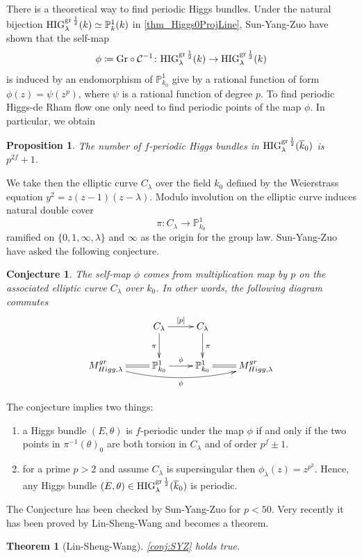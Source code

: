 \documentclass[12pt,twoside]{book}
\theoremstyle{plain}
\newtheorem{theorem}{Theorem}[section]
\newtheorem{conjecture}[conjecture]{Conjecture}
\newtheorem{proposition}[proposition]{Proposition}
\theoremstyle{definition}
\theoremstyle{remark}
\newcommand{\bP}{{\mathbb P}}
\newcommand{\mC}{{\mathcal C}}
\numberwithin{equation}{section}
\def\High{{\mathrm{HIG}^{{\rm gr}\,{1\over 2}}_{\lambda}}}
\def\bark{{\overline k}_0}
\begin{document}
There is a theoretical way to find periodic Higgs bundles. Under the natural bijection $\High(k) \simeq \bP^1_k(k)$ in \autoref{thm_Higgs0ProjLine}, Sun-Yang-Zuo have shown that the self-map
\[\phi\coloneqq \text{Gr}\circ
\mC^{-1}\colon \High(k)\rightarrow \High(k)\]
is induced by an endomorphism of $\bP_{k_0}^1$ give by a rational function of form $\phi(z)=\psi(z^p)$, where $\psi$ is a rational function of degree $p$. To find periodic Higgs-de Rham flow one only need to find periodic points of the map $\phi$. In particular, we obtain
\begin{proposition}
The number of $f$-periodic Higgs bundles in $\High(\bark)$ is $p^{2f}+1$.
\end{proposition}
We take then the elliptic curve $C_{\lambda}$ over the field $k_0$ defined by the Weierstrass equation $y^2=z(z-1)(z- \lambda)$. Modulo involution on the elliptic curve induces natural double cover
\[\pi\colon C_\lambda\to \bP^1_{k_0}\] ramified on $\{0,1,\infty,\lambda\}$ and $\infty$ as the origin for the group law. Sun-Yang-Zuo have asked the following conjecture.
\begin{conjecture}
The self-map $\phi$ comes from multiplication map by $p$ on the associated elliptic curve $C_\lambda$ over $k_0$. In other words, the following diagram commutes
\[\xymatrix{
& C_\lambda \ar[d]_{\pi} \ar[r]^{[p]} & C_\lambda\ar[d]^\pi & \\
M_{Higg,\lambda}^{gr}\ar@/_12pt/[rrr]_{\phi} \ar@{=}[r] & \bP^1_{k_0} \ar[r]^{\phi} & \bP^1_{k_0} \ar@{=}[r] & M_{Higg,\lambda}^{gr} \\
}\]
\end{conjecture}

The conjecture implies two things:
\begin{enumerate}
\item a Higgs bundle $(E,\theta)$ is $f$-periodic under the map $\phi$ if and only if the two points in $\pi^{-1}(\theta)_0$ are both torsion in $C_\lambda$ and of order $p^f\pm1$.
\item for a prime $p>2$ and assume $C_\lambda$ is supersingular then $\phi_\lambda(z)=z^{p^2}$. Hence, any Higgs bundle $(E,\theta)\in {\High}(\bark)$ is periodic.
\end{enumerate}

The Conjecture has been checked by Sun-Yang-Zuo for $p<50$. Very recently it has been proved by
Lin-Sheng-Wang \cite{LSW22} and becomes a theorem.
\begin{theorem} [Lin-Sheng-Wang]
\autoref{conj:SYZ} holds true.
\end{theorem}
\end{document}
